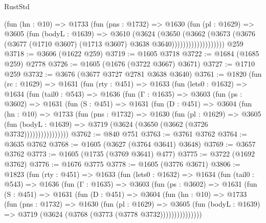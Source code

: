 \begin{lexlean}{RustStd}
\begin{coremodule}
                      (fun (hn : @10) =>
                      @1733
                        (fun (pns : @1732) =>
                        @1630
                          (fun (pl : @1629) =>
                          @3605
                            (fun (bodyL : @1639) =>
                            @3610
                              (@3624
                                (@3650
                                  (@3662
                                    (@3673
                                      (@3676
                                        (@3677
                                          (@1710 @3607)
                                          (@1713 @3607)
                                          @3638
                                          @3640)))))))))))))))))))
    @259
@3718 := @3606 (@1622 @259)
@3719 := @1605 @3718
@3722 := @1684 (@1685 @259) @2778
@3726 := @1605 (@1676 (@3722 @3667) @3671)
@3727 := @1710 @259
@3732 := @3676 (@3677 @3727 @2781 @3638 @3640)
@3761 := @1820
    (fun (rc : @1629) =>
    @1631
      (fun (rty : @451) =>
      @1633
        (fun (lets0 : @1632) =>
        @1634
          (fun (tail0 : @543) =>
          @1636
            (fun (Γ : @1635) =>
            @3603
              (fun (ps : @3602) =>
              @1631
                (fun (S : @451) =>
                @1631
                  (fun (D : @451) =>
                  @3604
                    (fun (hn : @10) =>
                    @1733
                      (fun (pns : @1732) =>
                      @1630
                        (fun (pl : @1629) =>
                        @3605
                          (fun (bodyL : @1639) =>
                          @3719 (@3624 (@3650 (@3662 (@3726 @3732))))))))))))))))
@3762 := @840 @751
@3763 := @3761 @3762
@3764 := @3635 @3762
@3768 := @1605 (@3627 (@3764 @3641) @3648)
@3769 := @3657 @3762
@3773 := @1605 (@1735 (@3769 @3641) @477)
@3775 := @3722 (@1692 @3762)
@3776 := @1676 @3775
@3778 := @1605 (@3776 @3671)
@3806 := @1823
    (fun (rty : @451) =>
    @1633
      (fun (lets0 : @1632) =>
      @1634
        (fun (tail0 : @543) =>
        @1636
          (fun (Γ : @1635) =>
          @3603
            (fun (ps : @3602) =>
            @1631
              (fun (S : @451) =>
              @1631
                (fun (D : @451) =>
                @3604
                  (fun (hn : @10) =>
                  @1733
                    (fun (pns : @1732) =>
                    @1630
                      (fun (pl : @1629) =>
                      @3605
                        (fun (bodyL : @1639) =>
                        @3719 (@3624 (@3768 (@3773 (@3778 @3732)))))))))))))))

\end{coremodule}
\end{lexlean}
